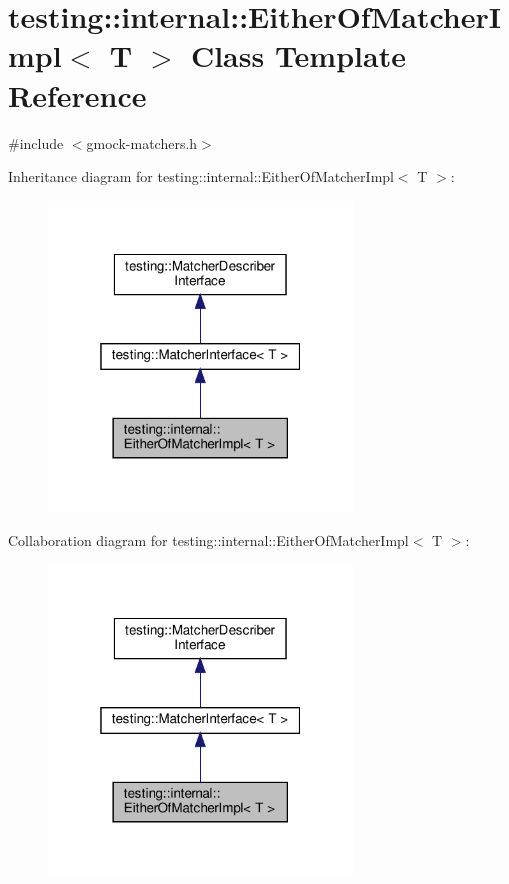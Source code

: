 \hypertarget{classtesting_1_1internal_1_1_either_of_matcher_impl}{}\section{testing\+:\+:internal\+:\+:Either\+Of\+Matcher\+Impl$<$ T $>$ Class Template Reference}
\label{classtesting_1_1internal_1_1_either_of_matcher_impl}


{\ttfamily \#include $<$gmock-\/matchers.\+h$>$}



Inheritance diagram for testing\+:\+:internal\+:\+:Either\+Of\+Matcher\+Impl$<$ T $>$\+:
\nopagebreak
\begin{figure}[H]
\begin{center}
\leavevmode
\includegraphics[width=229pt]{classtesting_1_1internal_1_1_either_of_matcher_impl__inherit__graph}
\end{center}
\end{figure}


Collaboration diagram for testing\+:\+:internal\+:\+:Either\+Of\+Matcher\+Impl$<$ T $>$\+:
\nopagebreak
\begin{figure}[H]
\begin{center}
\leavevmode
\includegraphics[width=229pt]{classtesting_1_1internal_1_1_either_of_matcher_impl__coll__graph}
\end{center}
\end{figure}
